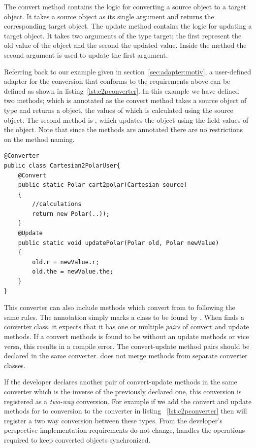 The convert method contains the logic for converting a source object to a target object. It takes a source object as its single argument and returns the corresponding target object. The update method contains the logic for updating a target object. It takes two arguments of the type target; the first represent the old value of the object and the second the updated value. Inside the method the second argument is used to update the first argument. 

Referring back to our example given in section~\ref{sec:adapter:motiv}, a user-defined adapter for the  conversion that conforms to the requirements above can be defined as shown in listing~\ref{lst:c2pconverter}. In this example we have defined two methods;  which is annotated as the convert method takes a source object of type  and returns a  object, the values of which is calculated using the source object. The second method is , which updates the   object using the field values of the  object. Note that since the methods are annotated there are no restrictions on the method naming. 

\begin{lstlisting}[float, caption={A converter defined for converting a Cartesian object to a Polar object}, label={lst:c2pconverter}]
@Converter
public class Cartesian2PolarUser{
	@Convert
	public static Polar cart2polar(Cartesian source)
	{
		//calculations
		return new Polar(..));
	}
	@Update
	public static void updatePolar(Polar old, Polar newValue)
	{
		old.r = newValue.r;
		old.the = newValue.the;
	}
}
\end{lstlisting}

This converter can also include methods which convert from  to  following the same rules. The  annotation simply marks a class to be found by \zamk. When \zamk finds a converter class, it expects that it has one or multiple \emph{pairs} of convert and update methods. If a convert methods is found to be without an update methods or vice versa, this results in a compile error. The convert-update method pairs should be declared in the same converter. \zamk does not merge methods from separate converter classes. 

If the developer declares another pair of convert-update methods in the same converter which is the inverse of the previously declared one, this conversion is registered as a \emph{two-way} conversion. 
For example if we add the convert and update methods for  to  conversion to the converter in listing~
\ref{lst:c2pconverter} then \zamk will register a two way conversion between these types.
From the developer's perspective implementation requirements do not change, \zamk handles the operations required to keep converted objects synchronized.


